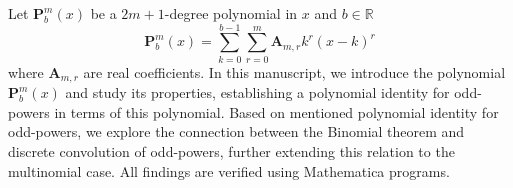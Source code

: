 Let $\mathbf{P}^{m}_{b}(x)$ be a $2m+1$-degree polynomial in $x$ and $b \in \mathbb{R}$
\[
    \mathbf{P}^{m}_{b}(x) = \sum_{k=0}^{b-1} \sum_{r=0}^{m} \mathbf{A}_{m,r} k^r (x-k)^r
\]
where $\mathbf{A}_{m,r}$ are real coefficients.
In this manuscript, we introduce the polynomial $\mathbf{P}^{m}_{b}(x)$ and study its properties,
establishing a polynomial identity for odd-powers in terms of this polynomial.
Based on mentioned polynomial identity for odd-powers,
we explore the connection between the Binomial theorem and discrete convolution of odd-powers,
further extending this relation to the multinomial case.
All findings are verified using Mathematica programs.
